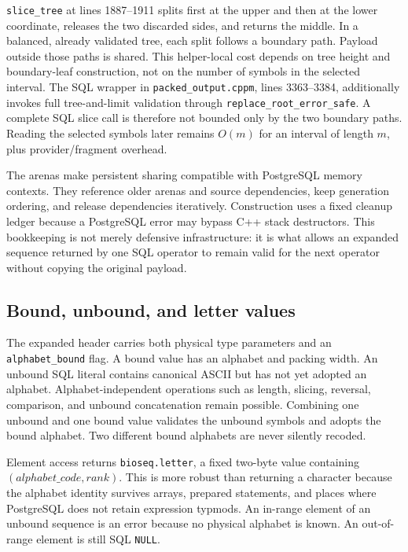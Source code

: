 \texttt{slice\_tree} at lines 1887--1911 splits first at the upper and then at
the lower coordinate, releases the two discarded sides, and returns the
middle.  In a balanced, already validated tree, each split follows a boundary
path.  Payload outside those paths is shared.  This helper-local cost depends
on tree height and boundary-leaf construction, not on the number of symbols in
the selected interval.  The SQL wrapper in \texttt{packed\_output.cppm},
lines 3363--3384, additionally invokes full tree-and-limit validation through
\texttt{replace\_root\_error\_safe}. A complete SQL slice call is therefore
not bounded only by the two boundary paths.  Reading the selected symbols
later remains \(O(m)\) for an interval of length \(m\), plus
provider/fragment overhead.

The arenas make persistent sharing compatible with PostgreSQL memory
contexts.  They reference older arenas and source dependencies, keep
generation ordering, and release dependencies iteratively.  Construction uses
a fixed cleanup ledger because a PostgreSQL error may bypass C++ stack
destructors.  This bookkeeping is not merely defensive infrastructure: it is
what allows an expanded sequence returned by one SQL operator to remain valid
for the next operator without copying the original payload.

\subsection{Bound, unbound, and letter values}

The expanded header carries both physical type parameters and an
\texttt{alphabet\_bound} flag.  A bound value has an alphabet and packing
width.  An unbound SQL literal contains canonical ASCII but has not yet
adopted an alphabet.  Alphabet-independent operations such as length, slicing,
reversal, comparison, and unbound concatenation remain possible.  Combining
one unbound and one bound value validates the unbound symbols and adopts the
bound alphabet.  Two different bound alphabets are never silently recoded.

Element access returns \texttt{bioseq.letter}, a fixed two-byte value
containing \((alphabet\_code,rank)\).  This is more robust than returning a
character because the alphabet identity survives arrays, prepared statements,
and places where PostgreSQL does not retain expression typmods.  An in-range
element of an unbound sequence is an error because no physical alphabet is
known.  An out-of-range element is still SQL \texttt{NULL}.


